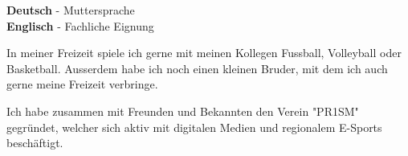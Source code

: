 \documentclass[9pt]{developercv} %
\begin{document}
\begin{minipage}[t]{0.3\textwidth}
	\vspace{-\baselineskip} %

	
	\textbf{Deutsch} - Muttersprache\\
	\textbf{Englisch} - Fachliche Eignung\\
\end{minipage}
\hfill
\begin{minipage}[t]{0.3\textwidth}
	\vspace{-\baselineskip} %
	
	
	In meiner Freizeit spiele ich gerne mit meinen Kollegen Fussball, Volleyball oder Basketball. Ausserdem habe ich noch einen kleinen Bruder, mit dem ich auch gerne meine Freizeit verbringe.
\end{minipage}
\hfill
\begin{minipage}[t]{0.3\textwidth}
	\vspace{-\baselineskip} %
	
	
  Ich habe zusammen mit Freunden und Bekannten den Verein "PR1SM" gegründet, welcher sich aktiv mit digitalen Medien und regionalem E-Sports beschäftigt.
\end{minipage}

\end{document}
